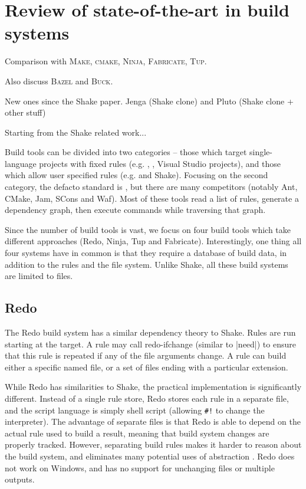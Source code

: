 \section{Review of state-of-the-art in build systems\label{section-review}}


Comparison with \textsc{Make}, \textsc{cmake}, \textsc{Ninja},
\textsc{Fabricate}, \textsc{Tup}.

Also discuss \textsc{Bazel} and \textsc{Buck}.

New ones since the Shake paper. Jenga (Shake clone) and Pluto (Shake clone + other stuff)

Starting from the Shake related work...

Build tools can be divided into two categories -- those which target single-language projects with fixed rules (e.g. , , Visual Studio projects), and those which allow user specified rules (e.g. \make{} and Shake). Focusing on the second category, the defacto standard is \make{}, but there are many \make{} competitors (notably Ant, CMake, Jam, SCons and Waf). Most of these tools read a list of rules, generate a dependency graph, then execute commands while traversing that graph.

Since the number of build tools is vast, we focus on four build tools which take different approaches (Redo, Ninja, Tup and Fabricate). Interestingly, one thing all four systems have in common is that they require a database of build data, in addition to the rules and the file system. Unlike Shake, all these build systems are limited to files.

\subsection{Redo\label{sec:redo}}


The Redo build system \cite{redo} has a similar dependency theory to Shake. Rules are run starting at the target. A rule may call \textsf{redo-ifchange} (similar to |need|) to ensure that this rule is repeated if any of the file arguments change. A rule can build either a specific named file, or a set of files ending with a particular extension.

While Redo has similarities to Shake, the practical implementation is significantly different. Instead of a single rule store, Redo stores each rule in a separate file, and the script language is simply shell script (allowing \verb"#!" to change the interpreter). The advantage of separate files is that Redo is able to depend on the actual rule used to build a result, meaning that build system changes are properly tracked. However, separating build rules makes it harder to reason about the build system, and eliminates many potential uses of abstraction \cite{jonge:build_components}. Redo does not work on Windows, and has no support for unchanging files or multiple outputs.

